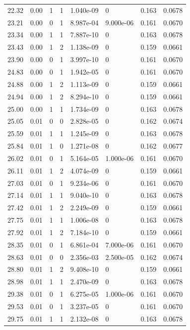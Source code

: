 \documentclass[preview]{standalone}
\begin{document}
{{{\begin{tabular}{L{1.2cm}C{1.2cm} C{0.3cm}C{0.5cm} C{1.4cm}C{1.4cm} C{1.4cm}C{1.4cm}}
  22.32  &  0.00  & 1     &  1 &  1.040e-09  & 0  & 0.163 &  0.0678   \\ 
  23.21  &  0.00  & 0     &  1 &  8.987e-04  & 9.000e-06  & 0.161 &  0.0670   \\ 
  23.34  &  0.00  & 1     &  1 &  7.887e-10  & 0  & 0.163 &  0.0678   \\ 
  23.43  &  0.00  & 1     &  2 &  1.138e-09  & 0  & 0.159 &  0.0661   \\ 
  23.90  &  0.00  & 0     &  1 &  3.997e-10  & 0  & 0.161 &  0.0670   \\ 
  24.83  &  0.00  & 0     &  1 &  1.942e-05  & 0  & 0.161 &  0.0670   \\ 
  24.88  &  0.00  & 1     &  2 &  1.113e-09  & 0  & 0.159 &  0.0661   \\ 
  24.94  &  0.00  & 1     &  2 &  8.294e-10  & 0  & 0.159 &  0.0661   \\ 
  25.00  &  0.00  & 1     &  1 &  1.734e-09  & 0  & 0.163 &  0.0678   \\ 
  25.05  &  0.01  & 0     &  0 &  2.828e-05  & 0  & 0.162 &  0.0674   \\ 
  25.59  &  0.01  & 1     &  1 &  1.245e-09  & 0  & 0.163 &  0.0678   \\ 
  25.84  &  0.01  & 1     &  0 &  1.271e-08  & 0  & 0.162 &  0.0677   \\ 
  26.02  &  0.01  & 0     &  1 &  5.164e-05  & 1.000e-06  & 0.161 &  0.0670   \\ 
  26.11  &  0.01  & 1     &  2 &  4.074e-09  & 0  & 0.159 &  0.0661   \\ 
  27.03  &  0.01  & 0     &  1 &  9.234e-06  & 0  & 0.161 &  0.0670   \\ 
  27.14  &  0.01  & 1     &  1 &  9.040e-10  & 0  & 0.163 &  0.0678   \\ 
  27.42  &  0.01  & 1     &  2 &  2.249e-09  & 0  & 0.159 &  0.0661   \\ 
  27.75  &  0.01  & 1     &  1 &  1.006e-08  & 0  & 0.163 &  0.0678   \\ 
  27.92  &  0.01  & 1     &  2 &  7.184e-10  & 0  & 0.159 &  0.0661   \\ 
  28.35  &  0.01  & 0     &  1 &  6.861e-04  & 7.000e-06  & 0.161 &  0.0670   \\ 
  28.63  &  0.01  & 0     &  0 &  2.356e-03  & 2.500e-05  & 0.162 &  0.0674   \\ 
  28.80  &  0.01  & 1     &  2 &  9.408e-10  & 0  & 0.159 &  0.0661   \\ 
  28.98  &  0.01  & 1     &  1 &  2.470e-09  & 0  & 0.163 &  0.0678   \\ 
  29.38  &  0.01  & 0     &  1 &  6.275e-05  & 1.000e-06  & 0.161 &  0.0670   \\ 
  29.53  &  0.01  & 0     &  1 &  3.237e-05  & 0  & 0.161 &  0.0670   \\ 
  29.75  &  0.01  & 1     &  1 &  2.132e-08  & 0  & 0.163 &  0.0678   \\ 
\hline 
\end{tabular} 

}}}
\end{document}
